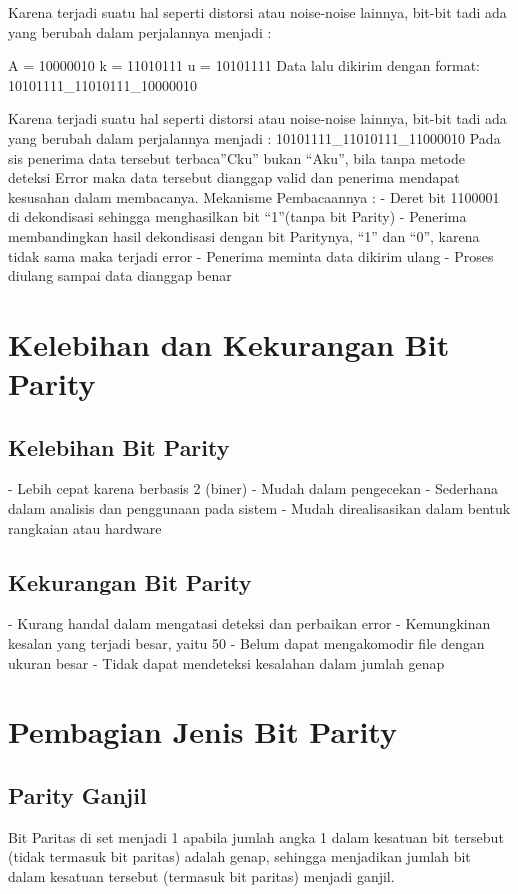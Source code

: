 Karena terjadi suatu hal seperti distorsi atau noise-noise lainnya, bit-bit tadi ada yang berubah dalam perjalannya menjadi :


A = 10000010
k = 11010111
u = 10101111
Data lalu dikirim dengan format: 10101111_11010111_10000010

Karena terjadi suatu hal seperti distorsi atau noise-noise lainnya, bit-bit tadi ada yang berubah dalam perjalannya menjadi :
10101111_11010111_11000010
Pada sis penerima data tersebut terbaca”Cku” bukan “Aku”, bila tanpa metode deteksi Error maka data tersebut dianggap valid dan penerima mendapat kesusahan dalam membacanya.
Mekanisme Pembacaannya :
-          Deret bit 1100001 di dekondisasi sehingga menghasilkan bit “1”(tanpa bit Parity)
-          Penerima membandingkan hasil dekondisasi dengan bit Paritynya, “1” dan “0”, karena tidak sama maka terjadi error
-          Penerima meminta data dikirim ulang
-          Proses diulang sampai data dianggap benar




\section{Kelebihan dan Kekurangan Bit Parity}
\subsection{Kelebihan Bit Parity}
-   Lebih cepat karena berbasis 2 (biner)
-   Mudah dalam pengecekan
-   Sederhana dalam analisis dan penggunaan pada sistem
-   Mudah direalisasikan dalam bentuk rangkaian atau hardware

\subsection{Kekurangan Bit Parity}
-   Kurang handal dalam mengatasi deteksi dan perbaikan error
-   Kemungkinan kesalan yang terjadi besar, yaitu 50%
-   Belum dapat mengakomodir file dengan ukuran besar
-   Tidak dapat mendeteksi kesalahan dalam jumlah genap



\section{Pembagian Jenis Bit Parity}
\subsection{Parity Ganjil}
Bit Paritas di set menjadi 1 apabila jumlah angka 1 dalam kesatuan bit tersebut (tidak termasuk bit paritas) adalah genap, sehingga menjadikan jumlah bit dalam kesatuan tersebut (termasuk bit paritas) menjadi ganjil.
 
